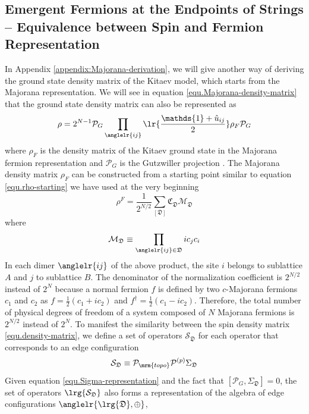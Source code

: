 \subsection{Emergent Fermions at the Endpoints of Strings -- Equivalence between Spin and Fermion Representation}\label{sec:Emergent-Fermions-at-the-Endpoints}
In Appendix \ref{appendix:Majorana-derivation}, we will give another way of deriving the ground state density matrix of the Kitaev model, which starts from the Majorana representation. We will see in equation \eqref{equ.Majorana-density-matrix} that the ground state density matrix can also be represented as
\[
  \rho = 2^{N-1}\mathcal{P}_G\prod_{\anglelr{ij}}\lr{\frac{\mathds{1}+\hat{u}_{ij}}{2}}\rho_F\mathcal{P}_G
\]
where $\rho_F$ is the density matrix of the Kitaev ground state in the Majorana fermion representation and $\mathcal{P}_G$ is the Gutzwiller projection \cite{burnell-nayak, projector-1, projector-2}. The Majorana density matrix $\rho_F$ can be constructed from a starting point similar to equation \eqref{equ.rho-starting} we have used at the very beginning
\begin{equation}\label{equ.rho-F}
    \rho^F = \frac{1}{2^{N/2}}\sum_{[\mathfrak{D}]}\mathfrak{C}_\mathfrak{D}\mathcal{M}_\mathfrak{D}
\end{equation}
where
\begin{equation}\label{equ.V-rep-def}
    \mathcal{M}_\mathfrak{D} \equiv \prod_{\anglelr{ij}\in\mathfrak{D}}ic_jc_i
\end{equation}
In each dimer $\anglelr{ij}$ of the above product, the site $i$ belongs to sublattice $A$ and $j$ to sublattice $B$. The denominator of the normalization coefficient is $2^{N/2}$ instead of $2^N$ because a normal fermion $f$ is defined by two $c$-Majorana fermions $c_1$ and $c_2$ as $f=\frac{1}{2}(c_1+ic_2)$ and $f^\dagger=\frac{1}{2}(c_1-ic_2)$. Therefore, the total number of physical degrees of freedom of a system composed of $N$ Majorana fermions is $2^{N/2}$ instead of $2^N$. To manifest the similarity between the spin density matrix \eqref{equ.density-matrix}, we define a set of operators $\mathcal{S}_{\mathfrak{D}}$ for each operator that corresponds to an edge configuration
\begin{equation}\label{equ.S-def}
    \mathcal{S}_\mathfrak{D} \equiv \mathcal{P}_{\mrm{topo}}\mathcal{P}^{(p)}\Sigma_\mathfrak{D}
\end{equation}
Given equation \eqref{equ.Sigma-representation} and the fact that $[\mathcal{P}_G,\Sigma_{\mathfrak{D}}]=0$, the set of operators $\lrg{\mathcal{S}_{\mathfrak{D}}}$ also forms a representation of the algebra of edge configurations $\anglelr{\lrg{\mathfrak{D}},\oplus}$, 
